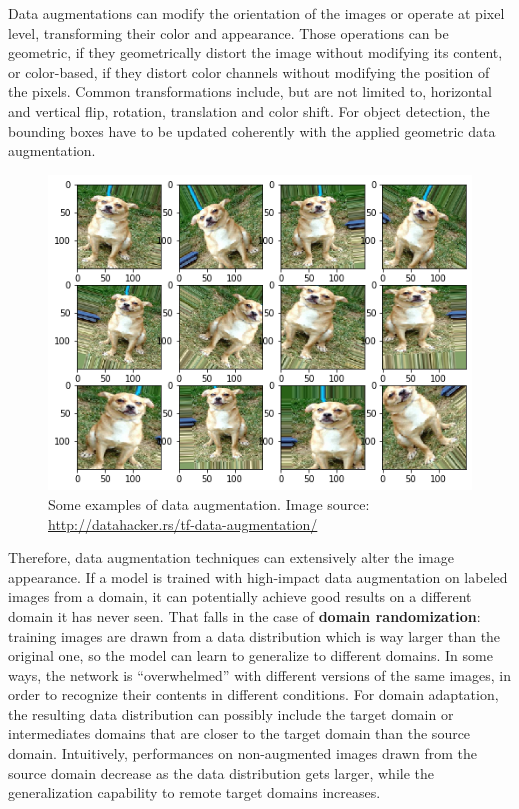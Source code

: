 \documentclass[%
    corpo=12pt,
    twoside,
    stile=classica,   
    tipotesi=magistrale,
    evenboxes,
    english,
	numerazioneromana,
]{toptesi}
\newcommand{\quotes}[1]{``#1''}
\begin{document}
Data augmentations can modify the orientation of the images or operate at pixel level, transforming their color and appearance. Those operations can be geometric, if they geometrically distort the image without modifying its content, or color-based, if they distort color channels without modifying the position of the pixels. Common transformations include, but are not limited to, horizontal and vertical flip, rotation, translation and color shift. For object detection, the bounding boxes have to be updated coherently with the applied geometric data augmentation.

\begin{figure}[ht!]
	\centering
	\includegraphics[width=0.8\linewidth]{imgs/augmentation.png}
	\caption[Some examples of data augmentation]{Some examples of data augmentation. Image source: \url{http://datahacker.rs/tf-data-augmentation/}}
	\label{fig:augmentation}
\end{figure}

Therefore, data augmentation techniques can extensively alter the image appearance. If a model is trained with high-impact data augmentation on labeled images from a domain, it can potentially achieve good results on a different domain it has never seen. That falls in the case of \textbf{domain randomization}: training images are drawn from a data distribution which is way larger than the original one, so the model can learn to generalize to different domains. In some ways, the network is \quotes{overwhelmed} with different versions of the same images, in order to recognize their contents in different conditions. For domain adaptation, the resulting data distribution can possibly include the target domain or intermediates domains that are closer to the target domain than the source domain. Intuitively, performances on non-augmented images drawn from the source domain decrease as the data distribution gets larger, while the generalization capability to remote target domains increases.
\end{document}
